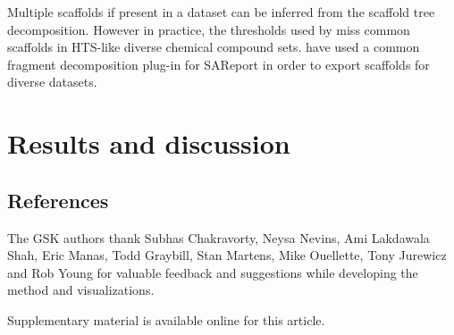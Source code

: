 \documentclass[journal=jacsat,manuscript=article]{achemso}
\begin{document}
Multiple scaffolds if present in a dataset can be inferred from the scaffold tree decomposition\cite{ClarkLabute2008SAReport}. However in practice, the thresholds used by \citeauthor{ClarkLabute2008SAReport} miss common scaffolds in HTS-like diverse chemical compound sets. \citeauthor{Bandyopadhyay2011ACS} have used a common fragment decomposition plug-in for SAReport in order to export scaffolds for diverse datasets.   

\section{Results and discussion}

\subsection{References}


\begin{acknowledgement}

The GSK authors thank Subhas Chakravorty, Neysa Nevins, Ami Lakdawala Shah, Eric Manas, Todd Graybill, Stan Martens, Mike Ouellette, Tony Jurewicz and Rob Young for valuable feedback and suggestions while developing the method and visualizations.   

\end{acknowledgement}

\begin{suppinfo}
Supplementary material is available online for this article.
\end{suppinfo}


\end{document}
